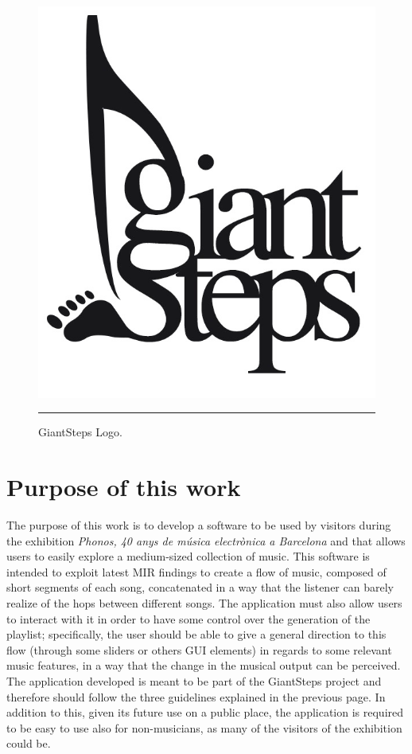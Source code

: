 \begin{figure}[htbp]
  \centering
    \includegraphics{Figures/giantsteps.png}
    \rule{35em}{0.5pt}
  \caption[GiantSteps]{GiantSteps Logo.}
  \label{fig:GiantSteps}
\end{figure}


\section{Purpose of this work}
The purpose of this work is to develop a software to be used by visitors during the exhibition \textit{Phonos, 40 anys de música electrònica a Barcelona} and that allows users to easily explore a medium-sized collection of music. This software is intended to exploit latest MIR findings to create a flow of music, composed of short segments of each song, concatenated in a way that the listener can barely realize of the hops between different songs. The application must also allow users to interact with it in order to have some control over the generation of the playlist; specifically, the user should be able to give a general direction to this flow (through some sliders or others GUI elements) in regards to some relevant music features, in a way that the change in the musical output can be perceived. The application developed is meant to be part of the GiantSteps project and therefore should follow the three guidelines explained in the previous page. In addition to this, given its future use on a public place, the application is required to be easy to use also for non-musicians, as many of the visitors of the exhibition could be.

